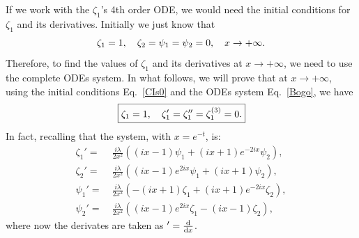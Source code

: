 \documentclass[%
 aip,
 jmp,%
 amsmath,amssymb,
 reprint,%
]{revtex4-2}
\begin{document}
If we work with the $\zeta_1$'s 4th order ODE, we would need the initial conditions for $\zeta_1$ and its derivatives. Initially we just know that
\begin{equation}\label{CIs0}
    \zeta_1=1,\quad \zeta_2=\psi_1=\psi_2=0, \quad x\to +\infty.
\end{equation}
Therefore, to find the values of $\zeta_1$ and its derivatives at $x\to +\infty$, we need to use the complete ODEs system.
In what follows, we will prove that at $x\to +\infty$, using the initial conditions Eq.~\eqref{CIs0} and the ODEs system Eq.~\eqref{Bogo}, we have
\begin{equation}\label{CIs}
 \boxed{
    \zeta_1=1,\quad \zeta_1'=\zeta_1''=\zeta_1^{(3)}=0.
    }
\end{equation}
In fact, recalling that the system, with $x=e^{-t}$, is:
\begin{equation}\label{eqCI:zeta'}
\begin{aligned}
    \zeta_1'= &~{} \frac{i\lambda }{2x^2} \left( \left(ix- 1\right)\psi_1 +\left(ix+ 1\right)e^{-2i x}\psi_2 \right), \\
    \zeta_2'=&~{}  \frac{i\lambda}{2x^2} \left( \left(ix-1\right)e^{2i x}\psi_1 + \left(ix+ 1\right)\psi_2 \right), \\
    \psi_1'= &~{}  \frac{i\lambda}{2x^2} \left(- \left(ix + 1\right)\zeta_1 +\left(ix + 1\right)e^{-2i x}\zeta_2 \right), \\
    \psi_2'=&~{}  \frac{i\lambda}{2x^2} \left( \left(ix - 1\right)e^{2i x}\zeta_1 - \left(ix - 1\right)\zeta_2 \right),
\end{aligned}
\end{equation}
where now the derivates are taken as $' = \dv{x}$.
\end{document}
